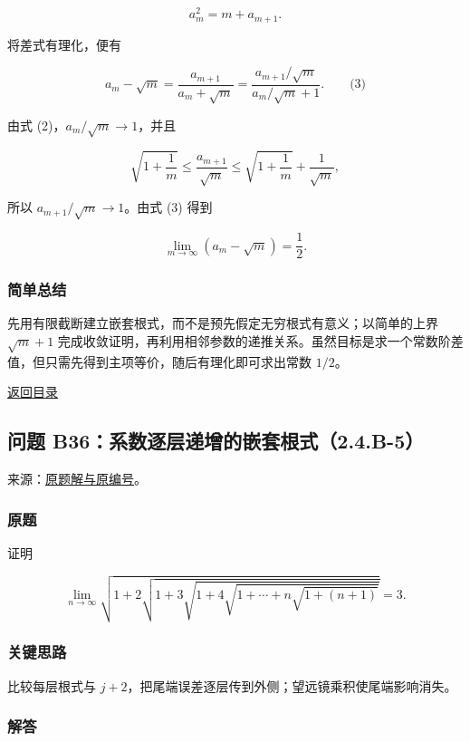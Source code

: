 \documentclass[11pt,a4paper]{article}
\begin{document}
\[
a_m^2=m+a_{m+1}.
\]

将差式有理化，便有

\[
a_m-\sqrt m
=\frac{a_{m+1}}{a_m+\sqrt m}
=\frac{a_{m+1}/\sqrt m}{a_m/\sqrt m+1}.
\qquad\text{(3)}
\]

由式 (2)，\(a_m/\sqrt m\to1\)，并且

\[
\sqrt{1+\frac1m}
\le\frac{a_{m+1}}{\sqrt m}
\le\sqrt{1+\frac1m}+\frac1{\sqrt m},
\]

所以 \(a_{m+1}/\sqrt m\to1\)。由式 (3) 得到

\[
\boxed{\lim_{m\to\infty}(a_m-\sqrt m)=\frac12.}
\]

\subsubsection{简单总结}\label{ux7b80ux5355ux603bux7ed3-2}

先用有限截断建立嵌套根式，而不是预先假定无穷根式有意义；以简单的上界
\(\sqrt m+1\)
完成收敛证明，再利用相邻参数的递推关系。虽然目标是求一个常数阶差值，但只需先得到主项等价，随后有理化即可求出常数
\(1/2\)。

\noindent\hyperref[contents]{返回目录}

\subsection{问题
B36：系数逐层递增的嵌套根式（2.4.B-5）}\label{ux95eeux9898-b36ux7cfbux6570ux9010ux5c42ux9012ux589eux7684ux5d4cux5957ux6839ux5f0f2.4.b-5}

来源：\href{https://zj139.github.io/math-notes/problems/0ce2ad9c1d045270806e755b/\#问题-b36}{原题解与原编号}。

\subsubsection{原题}\label{ux539fux9898-3}

证明

\[
\lim_{n\to\infty}\sqrt{1+2\sqrt{1+3\sqrt{1+4\sqrt{1+\cdots+n\sqrt{1+(n+1)}}}}}=3.
\]

\subsubsection{关键思路}\label{ux5173ux952eux601dux8def-3}

比较每层根式与
\(j+2\)，把尾端误差逐层传到外侧；望远镜乘积使尾端影响消失。

\subsubsection{解答}\label{ux89e3ux7b54-3}
\end{document}
